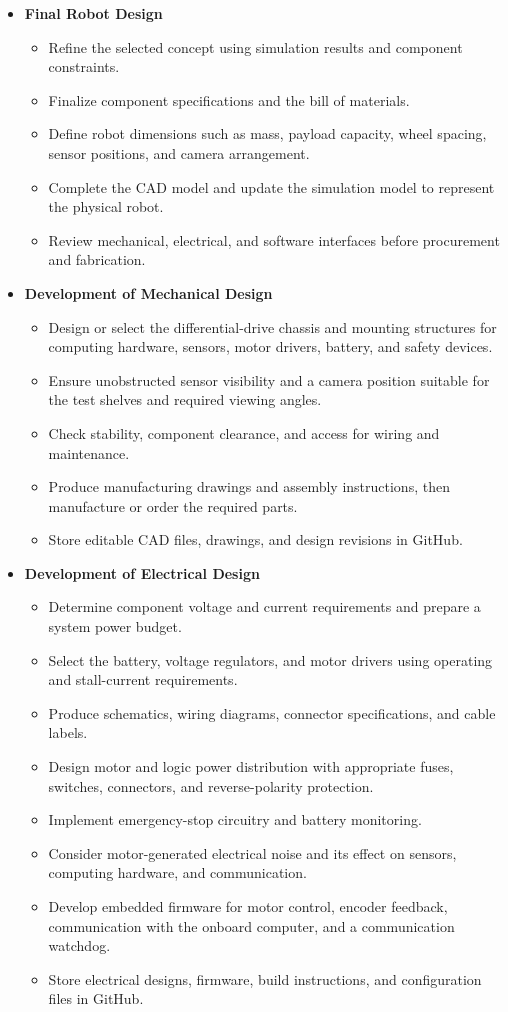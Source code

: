\documentclass{article}
\begin{document}
\begin{itemize}
	\item \textbf{Final Robot Design}
	\begin{itemize}
		\item Refine the selected concept using simulation results and component constraints.
		\item Finalize component specifications and the bill of materials.
		\item Define robot dimensions such as mass, payload capacity, wheel spacing, sensor positions, and camera arrangement.
		\item Complete the CAD model and update the simulation model to represent the physical robot.
		\item Review mechanical, electrical, and software interfaces before procurement and fabrication.
	\end{itemize}
	
	\item \textbf{Development of Mechanical Design}
	\begin{itemize}
		\item Design or select the differential-drive chassis and mounting structures for computing hardware, sensors, motor drivers, battery, and safety devices.
		\item Ensure unobstructed sensor visibility and a camera position suitable for the test shelves and required viewing angles.
		\item Check stability, component clearance, and access for wiring and maintenance.
		\item Produce manufacturing drawings and assembly instructions, then manufacture or order the required parts.
		\item Store editable CAD files, drawings, and design revisions in GitHub.
	\end{itemize}
	
	\item \textbf{Development of Electrical Design}
	\begin{itemize}
		\item Determine component voltage and current requirements and prepare a system power budget.
		\item Select the battery, voltage regulators, and motor drivers using operating and stall-current requirements.
		\item Produce schematics, wiring diagrams, connector specifications, and cable labels.
		\item Design motor and logic power distribution with appropriate fuses, switches, connectors, and reverse-polarity protection.
		\item Implement emergency-stop circuitry and battery monitoring.
		\item Consider motor-generated electrical noise and its effect on sensors, computing hardware, and communication.
		\item Develop embedded firmware for motor control, encoder feedback, communication with the onboard computer, and a communication watchdog.
		\item Store electrical designs, firmware, build instructions, and configuration files in GitHub.
	\end{itemize}
	

\end{itemize}
\end{document}
